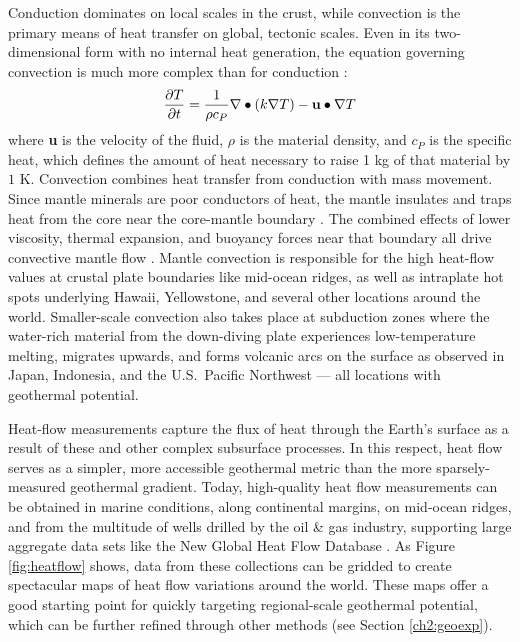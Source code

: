Conduction dominates on local scales in the crust, while convection is the primary means of heat transfer on global, tectonic scales. Even in its two-dimensional form with no internal heat generation, the equation governing convection is much more complex than for conduction \citep[p.\ 267]{turcotte_geodynamics_2002}:
\begin{equation}\label{eq:convection}
\frac{\partial T}{\partial t} = \frac{1}{\rho c_P}\nabla\bullet\left(k\nabla T\right)-{\bf u}\bullet\nabla T
\end{equation}
where \textbf{u} is the velocity of the fluid, $\rho$ is the material density, and $c_P$ is the specific heat, which defines the amount of heat necessary to raise 1 kg of that material by $1$ K. Convection combines heat transfer from conduction with mass movement. Since mantle minerals are poor conductors of heat, the mantle insulates and traps heat from the core near the core-mantle boundary \citep[p.\ 25]{glassley_geothermal_2015}. The combined effects of lower viscosity, thermal expansion, and buoyancy forces near that boundary all drive convective mantle flow \citep[p.\ 25]{glassley_geothermal_2015}. Mantle convection is responsible for the high heat-flow values at crustal plate boundaries like mid-ocean ridges, as well as intraplate hot spots underlying Hawaii, Yellowstone, and several other locations around the world. Smaller-scale convection also takes place at subduction zones where the water-rich material from the down-diving plate experiences low-temperature melting, migrates upwards, and forms volcanic arcs on the surface as observed in Japan, Indonesia, and the U.S.\ Pacific Northwest \citep[p.\ 31-33]{press_understanding_2004} --– all locations with geothermal potential.

Heat-flow measurements capture the flux of heat through the Earth’s surface as a result of these and other complex subsurface processes. In this respect, heat flow serves as a simpler, more accessible geothermal metric than the more sparsely-measured geothermal gradient. Today, high-quality heat flow measurements can be obtained in marine conditions, along continental margins, on mid-ocean ridges, and from the multitude of wells drilled by the oil \& gas industry, supporting large aggregate data sets like the New Global Heat Flow Database \citep{lucazeau_analysis_2019}. As Figure \ref{fig:heatflow} shows, data from these collections can be gridded to create spectacular maps of heat flow variations around the world. These maps offer a good starting point for quickly targeting regional-scale geothermal potential, which can be further refined through other methods (see Section \ref{ch2:geoexp}).

